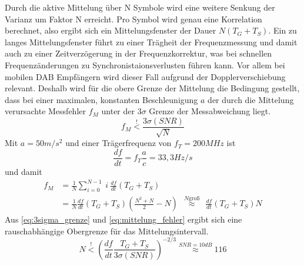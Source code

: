 Durch die aktive Mittelung über N Symbole wird eine weitere Senkung der Varianz um Faktor N erreicht. Pro Symbol wird genau eine Korrelation berechnet, also ergibt sich ein Mittelungsfenster der Dauer $N (T_G + T_S)$. Ein zu langes Mittelungsfenster führt zu einer Trägheit der Frequenzmessung und damit auch zu einer Zeitverzögerung in der Frequenzkorrektur, was bei schnellen Frequenzänderungen zu Synchronistaionsverlusten führen kann. Vor allem bei mobilen DAB Empfängern wird dieser Fall aufgrund der Dopplerverschiebung relevant. Deshalb wird für die obere Grenze der Mittelung die Bedingung gestellt, dass bei einer maximalen, konstanten Beschleunigung $a$ der durch die Mittelung verursachte Messfehler $f_M$ unter der $3\sigma$ Grenze der Messabweichung liegt.
\begin{equation}
f_M \overset{!}{<} \frac{3\sigma(SNR)}{\sqrt{N}}
\label{eq:3sigma_grenze}
\end{equation}
Mit $a=50m/s^2$ und einer Trägerfrequenz von $f_T = 200 MHz$ ist
\begin{equation}
\frac{df}{dt} = f_T \frac{a}{c} = 33,3 Hz/s
\end{equation}
und damit
\begin{equation}
\begin{aligned}
f_M &= \frac{1}{N} \sum \limits_{i=0}^{N-1}\: i \: \frac{df}{dt} (T_G+T_S) \\
&= \frac{1}{N} \frac{df}{dt} (T_G+T_S) \left(\frac{N^2 + N}{2} - N\right) \ \ {\overset{N\text{groß}}{\approx}} \ \  \frac{df}{dt} (T_G+T_S) N
\end{aligned}
\label{eq:mittelung_fehler}
\end{equation}
Aus \ref{eq:3sigma_grenze} und \ref{eq:mittelung_fehler} ergibt sich eine rauschabhängige Obergrenze für das Mittelungsintervall.
\begin{equation}
N \overset{!}{<} \left(\frac{df}{dt}\frac{T_G + T_S}{3 \sigma(SNR)}\right)^{-2/3} \overset{SNR=10dB}{\approx} 116
\end{equation}
